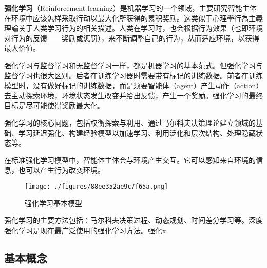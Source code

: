 
\textbf{强化学习}（Reinforcement learning）是机器学习的一个领域，主要研究智能主体在环境中应该怎样采取行动以最大化所获得的累积奖励。这类似于心理學行為主義理論关于人类学习行为的相关描述。人类在学习时，也会根据行为效果（也即环境对行为的反馈——奖励或惩罚），来不断调整自己的行为，从而适应环境，以获得最大价值。

强化学习与监督学习和无监督学习一样，都是机器学习的基本范式。但强化学习与监督学习也很大区别。后者在训练学习器时需要带有标记的训练数据。前者在训练模型时，没有做好标记的训练数据，而是须要智能体（agent）产生动作（action）去主动探索环境，环境状态发生改变并给出反馈，产生一个奖励。强化学习的最终目标是尽可能使得奖励最大化。

强化学习的核心问题，包括权衡探索与利用、通过马尔科夫决策理论建立领域的基础、学习延迟强化、构建经验模型以加速学习、利用泛化和层次结构、处理隐藏状态等。

在标准强化学习模型中，智能体主体会与环境产生交互。它可以感知来自环境的信息，也可以产生行为改变环境。

\begin{figure}[ht]
\centering
\texttt{[image: ./figures/88ee352ae9c7f65a.png]}
\caption{强化学习基本模型} \label{fig_rl_1}
\end{figure}

强化学习的主要方法包括：马尔科夫决策过程、动态规划、时间差分学习等。深度强化学习是现在最广泛使用的强化学习方法。强化x

\subsection{基本概念}

